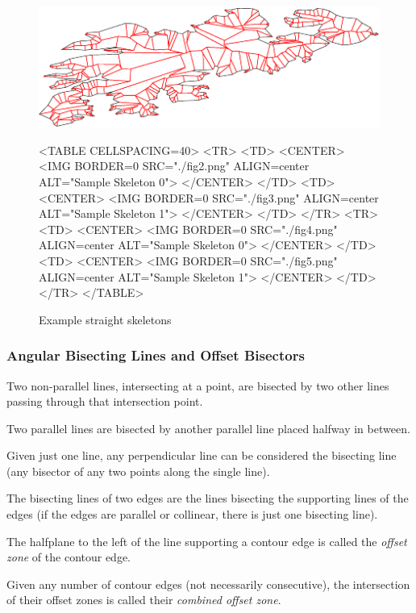 \begin{figure}[htbp]
\begin{ccTexOnly}
\begin{center}
\includegraphics{Straight_skeleton_2/fig5} %
\end{center}
\end{ccTexOnly}

\begin{ccHtmlOnly}
<TABLE CELLSPACING=40>
<TR>
<TD>
<CENTER>
<IMG BORDER=0 SRC="./fig2.png" ALIGN=center ALT="Sample Skeleton 0">
</CENTER>
</TD>
<TD>
<CENTER>
<IMG BORDER=0 SRC="./fig3.png" ALIGN=center ALT="Sample Skeleton 1">
</CENTER>
</TD>
</TR>
<TR>
<TD>
<CENTER>
<IMG BORDER=0 SRC="./fig4.png" ALIGN=center ALT="Sample Skeleton 0">
</CENTER>
</TD>
<TD>
<CENTER>
<IMG BORDER=0 SRC="./fig5.png" ALIGN=center ALT="Sample Skeleton 1">
</CENTER>
</TD>
</TR>
</TABLE>
\end{ccHtmlOnly}

\caption{Example straight skeletons
\label{SampleSLS}}
\end{figure}
  
\subsubsection{Angular Bisecting Lines and Offset Bisectors}  

Two non-parallel lines, intersecting at a point, are bisected by two
other lines passing through that intersection point.

Two parallel lines are bisected by another parallel line placed
halfway in between.

Given just one line, any perpendicular line can be considered the
bisecting line (any bisector of any two points along the single line).

The bisecting lines of two edges are the lines bisecting the
supporting lines of the edges (if the edges are parallel or collinear,
there is just one bisecting line).

The halfplane to the left of the line supporting a contour edge is
called the {\em offset zone} of the contour edge.

Given any number of contour edges (not necessarily consecutive), the
intersection of their offset zones is called their {\em combined
offset zone}.

